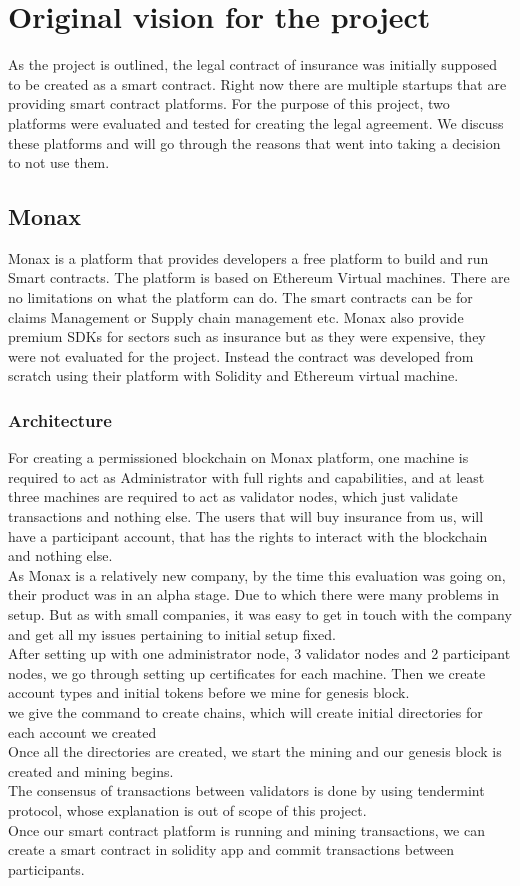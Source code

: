 \section{Original vision for the project}
As the project is outlined, the legal contract of insurance was initially supposed to be created as a smart contract. Right now there are multiple startups that are providing smart contract platforms. For the purpose of this project, two platforms were evaluated and tested for creating the legal agreement. We discuss these platforms and will go through the reasons that went into taking a decision to not use them. 

\subsection{Monax}
Monax is a platform that provides developers a free platform to build and run Smart contracts. The platform is based on Ethereum Virtual machines. There are no limitations on what the platform can do. The smart contracts can be for claims Management or Supply chain management etc. Monax also provide premium SDKs for sectors such as insurance but as they were expensive, they were not evaluated for the project. Instead the contract was developed from scratch using their platform with Solidity and Ethereum virtual machine. 
\subsubsection{Architecture}
For creating a permissioned blockchain on Monax platform, one machine is  required to act as Administrator with full rights and capabilities, and at least three machines are required to act as validator nodes, which just validate transactions and nothing else. The users that will buy insurance from us, will have a participant account, that has the rights to interact with the blockchain and nothing else.
\\ As Monax is a relatively new company, by the time this evaluation was going on, their product was in an alpha stage. Due to which there were many problems in setup. But as with small companies, it was easy to get in touch with the company and get all my issues pertaining to initial setup fixed. 
\\After setting up with one administrator node, 3 validator nodes and 2 participant nodes, we go through setting up certificates for each machine. Then we create account types and initial tokens before we mine for genesis block. 
\\ we give the command to create chains, which will create initial directories for each account we created
\\Once all the directories are created, we start the mining and our genesis block is created and mining begins.
\\The consensus of transactions between validators is done by using tendermint protocol, whose explanation is out of scope of this project.
\\Once our smart contract platform is running and mining transactions, we can create a smart contract in solidity app and commit transactions between participants.

